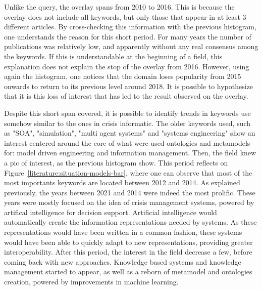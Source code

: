 Unlike the query, the overlay spans from 2010 to 2016. This is because the overlay does not include all keywords, but only those that appear in at least 3 different articles.
By cross-checking this information with the previous histogram, one understands the reason for this short period.
For many years the number of publications was relatively low, and apparently without any real consensus among the keywords.
If this is understandable at the beginning of a field, this explanation does not explain the stop of the overlay from 2016.
However, using again the histogram, one notices that the domain loses popularity from 2015 onwards to return to its previous level around 2018.
It is possible to hypothesize that it is this loss of interest that has led to the result observed on the overlay.

Despite this short span covered, it is possible to identify trends in keywords use somehow similar to the ones in crisis informatic.
The older keywords used, such as "SOA", "simulation", "multi agent systems" and "systems engineering" show an interest centered around the core of what were used ontologies and metamodels for: model driven engineering and information management.
Then, the field knew a pic of interest, as the previous histogram show.
This period reflects on Figure~\ref{literature:situation-models-bar}, where one can observe that most of the most importants keywords are located between 2012 and 2014.
As explained previously, the years between 2021 and 2014 were indeed the most prolific.
These years were mostly focused on the idea of crisis management systems, powered by artifical intelligence for decision support.
Artificial intelligence would automatically create the information representations needed by systems.
As these representations would have been written in a common fashion, these systems would have been able to quickly adapt to new representations, providing greater interoperability.
After this period, the interest in the field decrease a few, before coming back with new approaches.
Knowledge based systems and knowledge management started to appear, as well as a reborn of metamodel and ontologies creation, powered by improvements in machine learning.

